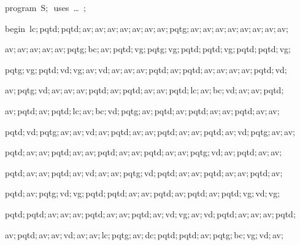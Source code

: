 
{
\parindent {}
\medskip

\carrenoir
\vspace{\neglskip}\mbox{\blc  \idt  \mcl program\idt \ S$;$
}\mbox{\blc \blk\idt \mcl uses\idt \ \ldots\ $;$
}\par 
\vspace{\neglskip}\mbox{\blc  \idt  \mcl begin\idt \ lc$;$pqtd$;$pqtd$;$av$;$av$;$av$;$av$;$av$;$av$;$av$;$pqtg$;$av$;$av$;$av$;$av$;$av$;$av$;$av$;$av$;$}\par 
\vspace{\neglskip}\mbox{\blc  \idt  av$;$av$;$av$;$av$;$av$;$pqtg$;$bc$;$av$;$pqtd$;$vg$;$pqtg$;$vg$;$pqtd$;$pqtd$;$vg$;$pqtd$;$pqtd$;$vg$;$}\par 
\vspace{\neglskip}\mbox{\blc  \idt  pqtg$;$vg$;$pqtd$;$vd$;$vg$;$av$;$vd$;$av$;$av$;$av$;$pqtd$;$av$;$pqtd$;$av$;$av$;$av$;$av$;$pqtd$;$vd$;$}\par 
\vspace{\neglskip}\mbox{\blc  \idt  av$;$pqtg$;$vd$;$av$;$av$;$av$;$pqtd$;$av$;$pqtd$;$av$;$av$;$pqtd$;$lc$;$av$;$bc$;$vd$;$av$;$av$;$pqtd$;$}\par 
\vspace{\neglskip}\mbox{\blc  \idt  av$;$pqtd$;$av$;$pqtd$;$lc$;$av$;$bc$;$vd$;$pqtg$;$av$;$pqtd$;$av$;$pqtd$;$av$;$av$;$pqtd$;$av$;$av$;$}\par 
\vspace{\neglskip}\mbox{\blc  \idt  pqtd$;$vd$;$pqtg$;$av$;$av$;$vd$;$av$;$pqtd$;$av$;$av$;$pqtd$;$av$;$av$;$pqtd$;$av$;$vd$;$pqtg$;$av$;$av$;$}\par 
\vspace{\neglskip}\mbox{\blc  \idt  pqtd$;$av$;$av$;$pqtd$;$av$;$av$;$pqtd$;$av$;$av$;$pqtd$;$av$;$av$;$pqtg$;$vd$;$av$;$pqtd$;$av$;$av$;$}\par 
\vspace{\neglskip}\mbox{\blc  \idt  pqtd$;$av$;$av$;$pqtd$;$av$;$vd$;$av$;$av$;$pqtg$;$vd$;$pqtd$;$av$;$av$;$pqtd$;$av$;$av$;$pqtd$;$av$;$}\par 
\vspace{\neglskip}\mbox{\blc  \idt  pqtd$;$av$;$pqtg$;$vd$;$vg$;$pqtd$;$pqtd$;$av$;$av$;$pqtd$;$av$;$pqtd$;$av$;$pqtd$;$vg$;$vd$;$vg$;$}\par 
\vspace{\neglskip}\mbox{\blc  \idt  pqtd$;$pqtd$;$av$;$av$;$av$;$pqtd$;$av$;$av$;$pqtd$;$av$;$vd$;$vg$;$av$;$vd$;$pqtd$;$av$;$av$;$av$;$pqtd$;$}\par 
\vspace{\neglskip}\mbox{\blc  \idt  av$;$pqtd$;$av$;$av$;$vd$;$av$;$av$;$lc$;$pqtg$;$av$;$dc$;$pqtd$;$pqtd$;$av$;$pqtg$;$bc$;$vg$;$vd$;$av$;$}\par 
}
